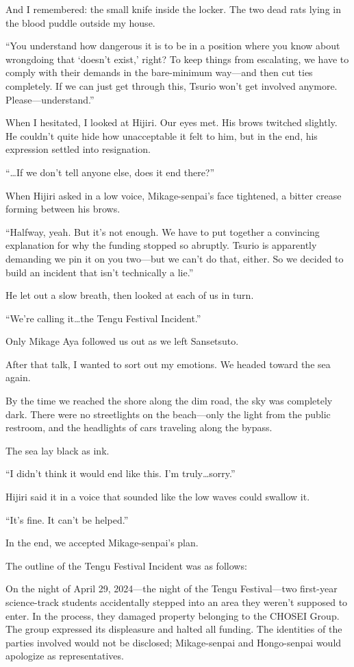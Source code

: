 \documentclass[
    a4paper,
    12pt,
    twoside,
    openany,
    UTF8,
    fontset=windows
]{ctexbook}
\begin{document}
And I remembered: the small knife inside the locker. The two dead rats lying in the blood puddle outside my house.

``You understand how dangerous it is to be in a position where you know about wrongdoing that `doesn't exist,' right? To keep things from escalating, we have to comply with their demands in the bare-minimum way---and then cut ties completely. If we can just get through this, Tsurio won't get involved anymore. Please---understand.''

When I hesitated, I looked at Hijiri. Our eyes met. His brows twitched slightly. He couldn't quite hide how unacceptable it felt to him, but in the end, his expression settled into resignation.

``\dots If we don't tell anyone else, does it end there?''

When Hijiri asked in a low voice, Mikage-senpai's face tightened, a bitter crease forming between his brows.

``Halfway, yeah. But it's not enough. We have to put together a convincing explanation for why the funding stopped so abruptly. Tsurio is apparently demanding we pin it on you two---but we can't do that, either. So we decided to build an incident that isn't technically a lie.''

He let out a slow breath, then looked at each of us in turn.

``We're calling it\dots the Tengu Festival Incident.''

Only Mikage Aya followed us out as we left Sansetsuto.

After that talk, I wanted to sort out my emotions. We headed toward the sea again.

By the time we reached the shore along the dim road, the sky was completely dark. There were no streetlights on the beach---only the light from the public restroom, and the headlights of cars traveling along the bypass.

The sea lay black as ink.

``I didn't think it would end like this. I'm truly\dots sorry.''

Hijiri said it in a voice that sounded like the low waves could swallow it.

``It's fine. It can't be helped.''

In the end, we accepted Mikage-senpai's plan.

The outline of the Tengu Festival Incident was as follows:

On the night of April 29, 2024---the night of the Tengu Festival---two first-year science-track students accidentally stepped into an area they weren't supposed to enter. In the process, they damaged property belonging to the CHOSEI Group. The group expressed its displeasure and halted all funding. The identities of the parties involved would not be disclosed; Mikage-senpai and Hongo-senpai would apologize as representatives.
\end{document}
